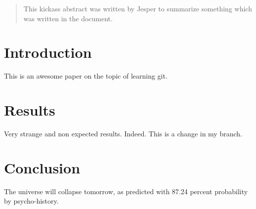 \documentclass{article}
\begin{document}
\begin{abstract}
This kickass abstract was written by Jesper to summarize something which was written in the document.
\end{abstract}

\section{Introduction}

This is an awesome paper on the topic of learning git.

\section{Results}

Very strange and non expected results.  
Indeed.
This is a change in my branch.

\section{Conclusion}

The universe will collapse tomorrow, as predicted with 87.24 percent probability by psycho-history.
\end{document}
